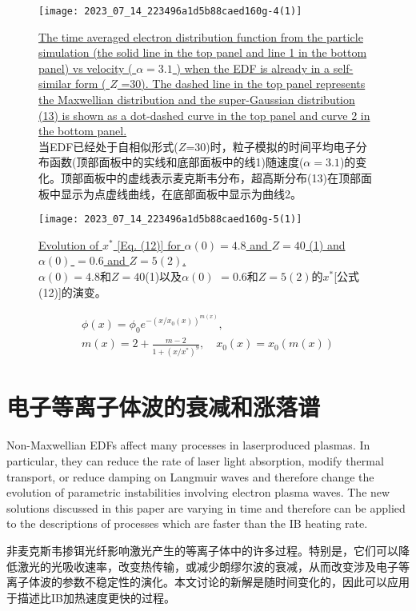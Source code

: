 \documentclass[oneside,onecolumn]{article}
\newcommand\enzhbox[2]{
	\quad\par \begin{paracol}{2} 
			\begin{spacing}{1.0}
					\footnotesize  #1
			\end{spacing}
			
		\switchcolumn[1] 
		#2
	\end{paracol} 
}
\begin{document}
\begin{sloppypar}
  \begin{figure}[tbp]
  	\centering
  	\texttt{[image: 2023\_07\_14\_223496a1d5b88caed160g-4(1)]}
  	\caption{\uline{The time averaged electron distribution function from the particle simulation (the solid line in the top panel and line 1 in the bottom panel) vs velocity ( $\alpha=3.1$ ) when the EDF is already in a self-similar form ( $Z$ =30). The dashed line in the top panel represents the Maxwellian distribution and the super-Gaussian distribution (13) is shown as a dot-dashed curve in the top panel and curve 2 in the bottom panel.}\\当EDF已经处于自相似形式($Z$=30)时，粒子模拟的时间平均电子分布函数(顶部面板中的实线和底部面板中的线1)随速度($\alpha=3.1$)的变化。顶部面板中的虚线表示麦克斯韦分布，超高斯分布(13)在顶部面板中显示为点虚线曲线，在底部面板中显示为曲线2。}
  	\label{figure3}
  \end{figure}
  
  \begin{figure}[tbp]
  	\centering
  	\texttt{[image: 2023\_07\_14\_223496a1d5b88caed160g-5(1)]}
  	\caption{\uline{Evolution of $x^{*}$ [Eq. (12)] for $\alpha(0)=4.8$ and $Z=40$ (1) and $\alpha(0)$ $=0.6$ and $Z=5(2)$.}\\$\alpha(0)=4.8$和$Z=40$(1)以及$\alpha(0)$ $=0.6$和$Z=5(2)$的$x^{*}$[公式(12)]的演变。}
  	\label{figure4}
  \end{figure}
  
  \begin{equation}
  \begin{gathered}
  	\phi(x)=\phi_{0} e^{-\left(x / x_{0}(x)\right)^{m(x)}},\\
  m(x)=2+\frac{m-2}{1+\left(x / x^{*}\right)^{9}}, \quad x_{0}(x)=x_{0}(m(x))
  \end{gathered}
  \end{equation}

  
  
  \section{电子等离子体波的衰减和涨落谱}

\enzhbox{  Non-Maxwellian EDFs affect many processes in laserproduced plasmas. In particular, they can reduce the rate of laser light absorption, modify thermal transport, or reduce damping on Langmuir waves and therefore change the evolution of parametric instabilities involving electron plasma waves. The new solutions discussed in this paper are varying in time and therefore can be applied to the descriptions of processes which are faster than the IB heating rate.
}{
非麦克斯韦掺铒光纤影响激光产生的等离子体中的许多过程。特别是，它们可以降低激光的光吸收速率，改变热传输，或减少朗缪尔波的衰减，从而改变涉及电子等离子体波的参数不稳定性的演化。本文讨论的新解是随时间变化的，因此可以应用于描述比IB加热速度更快的过程。
}
  


\end{sloppypar}
\end{document}
